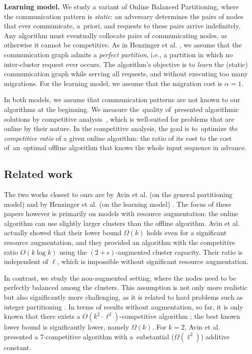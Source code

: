 \documentclass[a4paper,anonymous,USenglish]{lipics-v2019}
\begin{document}
\noindent
\textbf{Learning model.}
We study a variant of Online Balanced Partitioning,
where the communication pattern is \emph{static}:
an adversary determines the pairs of nodes that ever communicate, a~priori,
and requests to these pairs arrive indefinitely.
Any algorithm must eventually collocate  pairs of communicating nodes,
as otherwise it cannot be competitive.
As in Henzinger et al. \cite{sigmetrics19_partitioning}, we assume that the communication graph admits a \emph{perfect partition},
i.e., a partition in which no inter-cluster request ever occurs.
The algorithm's objective is to \emph{learn} the (static) communication graph
 while serving all requests,
and without executing too many migrations.
For the learning model, we  assume that the migration cost is $\alpha=1$.

\medskip 
In both models, we assume that communication patterns are not known to our algorithms at the beginning.
We measure the~quality of~presented algorithmic solutions by competitive analysis~\cite{borodin-book}, which is well-suited for problems that are online by their nature.
In the competitive analysis, the goal is to~optimize \emph{the competitive ratio} of a given online algorithm: the ratio of its cost to the cost of~an~optimal offline algorithm that knows the whole input sequence in advance.


\subsection{Related work}

The two works closest to ours are by Avin et al. (on the general partitioning model) \cite{repartition-disc, sidma-arxiv} and by Henzinger et al. (on the learning model) \cite{sigmetrics19_partitioning}.
The focus of these papers however is primarily on models with resource augmentation: the online algorithm can use slightly larger clusters than the offline algorithm.  
Avin et al. actually showed that their lower bound $\Omega(k)$ holds even for a significant resource augmentation, and they provided an algorithm with the competitive ratio $O(k \log k)$ using the $(2+\epsilon)$-augmented cluster capacity.
Their ratio is independent of $\ell$, which is impossible without significant resource augmentation.



In contrast, we study the non-augmented setting, where the nodes need to be perfectly balanced  among the clusters.
This assumption is not only more realistic but also significantly more challenging, as it is related to hard problems such as integer partitioning \cite{integer-partitions-book}.
In terms of results without augmentation, so far, it is only known that there exists a $O(k^2 \cdot \ell^2)$-competitive algorithm \cite{repartition-disc}; the best known lower bound is significantly lower, namely $\Omega(k)$.
For $k=2$, Avin et al.\cite{repartition-disc} presented a $7$-competitive algorithm with a~substantial ($\Omega(\ell^2)$) additive constant.
\end{document}
